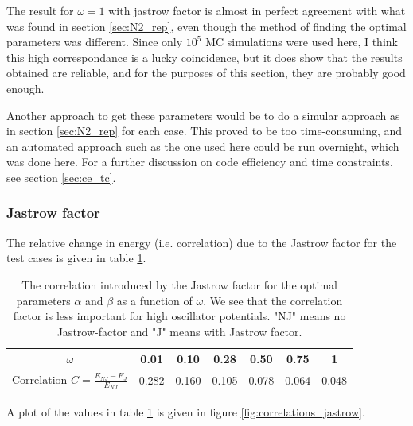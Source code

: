 The result for $\omega =1$ with jastrow factor is almost in perfect agreement with what was found in section \ref{sec:N2_rep}, even though the method of finding the optimal parameters was different. 
Since only $10^5$ MC simulations were used here, I think this high correspondance is a lucky coincidence, but it does show that the results obtained are reliable, and for the purposes of this section, they are probably good enough. 

Another approach to get these parameters would be to do a simular approach as in section \ref{sec:N2_rep} for each case. 
This proved to be too time-consuming, and an automated approach such as the one used here could be run overnight, which was done here. 
For a further discussion on code efficiency and time constraints, see section \ref{sec:ce_tc}.



\subsubsection{Jastrow factor}\label{sec:res_jastrow}

The relative change in energy (i.e. correlation) due to the Jastrow factor for the test cases is given in table \ref{tab:correlations_jastrow}.

\begin{table}[h!]
	\centering
	\begin{tabular}{ccccccc}
	\toprule
	$\omega$	& 0.01 & 0.10 & 0.28 & 0.50 & 0.75 & 1 \\
	\midrule
	Correlation $C = \frac{E_{NJ} - E_{J}}{E_{NJ}}$ & 0.282 & 0.160 & 0.105 & 0.078 & 0.064 & 0.048 \\
	\bottomrule
	\end{tabular}
	\caption{The correlation introduced by the Jastrow factor for the optimal parameters $\alpha$ and $\beta$ as a function of $\omega$. 
	We see that the correlation factor is less important for high oscillator potentials.
	"NJ" means no Jastrow-factor and "J" means with Jastrow factor.}
	\label{tab:correlations_jastrow}
\end{table}

A plot of the values in table \ref{tab:correlations_jastrow} is given in figure \ref{fig:correlations_jastrow}. 

